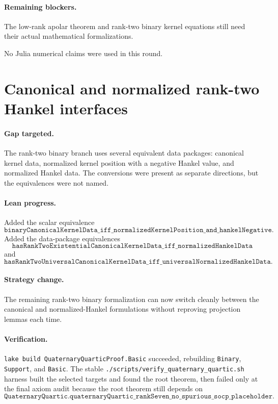 \documentclass[11pt]{article}
\begin{document}
\paragraph{Remaining blockers.}
The low-rank apolar theorem and rank-two binary kernel equations still need
their actual mathematical formalizations.

No Julia numerical claims were used in this round.

\section*{Canonical and normalized rank-two Hankel interfaces}

\paragraph{Gap targeted.}
The rank-two binary branch uses several equivalent data packages:
canonical kernel data, normalized kernel position with a negative Hankel value,
and normalized Hankel data.  The conversions were present as separate
directions, but the equivalences were not named.

\paragraph{Lean progress.}
Added the scalar equivalence
\[
\texttt{binaryCanonicalKernelData\_iff\_normalizedKernelPosition\_and\_hankelNegative}.
\]
Added the data-package equivalences
\[
\texttt{hasRankTwoExistentialCanonicalKernelData\_iff\_normalizedHankelData}
\]
and
\[
\texttt{hasRankTwoUniversalCanonicalKernelData\_iff\_universalNormalizedHankelData}.
\]

\paragraph{Strategy change.}
The remaining rank-two binary formalization can now switch cleanly between the
canonical and normalized-Hankel formulations without reproving projection
lemmas each time.

\paragraph{Verification.}
\texttt{lake build QuaternaryQuarticProof.Basic} succeeded, rebuilding
\texttt{Binary}, \texttt{Support}, and \texttt{Basic}.  The stable
\texttt{./scripts/verify\_quaternary\_quartic.sh} harness built the selected
targets and found the root theorem, then failed only at the final axiom audit
because the root theorem still depends on
\[
\texttt{QuaternaryQuartic.quaternaryQuartic\_rankSeven\_no\_spurious\_socp\_placeholder}.
\]
\end{document}
